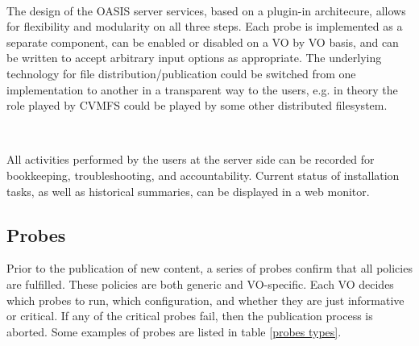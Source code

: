 \documentclass[a4paper]{jpconf}
\begin{document}
~

The design of the OASIS server services, 
based on a plugin-in architecure, 
allows for flexibility and modularity on all three steps. 
Each probe is implemented as a separate component, 
can be enabled or disabled on a VO by VO basis, 
and can be written to accept arbitrary input options as appropriate. 
The underlying technology for file distribution/publication could be switched 
from one implementation to another in a transparent way to the users, e.g. in
theory the role played by CVMFS could be played by some other distributed
filesystem. 

~

All activities performed by the users at the server side 
can be recorded for bookkeeping, troubleshooting, and accountability. 
Current status of installation tasks, as well as historical summaries, 
can be displayed in a web monitor. 


\subsection{Probes}

Prior to the publication of new content, 
a series of probes confirm that all policies are fulfilled. 
These policies are both generic and VO-specific.
Each VO decides which probes to run, which configuration, 
and whether they are just informative or critical.
If any of the critical probes fail, then the publication process is aborted. 
Some examples of probes are listed in table \ref{probes types}.

~
\end{document}
